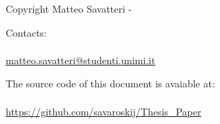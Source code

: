Copyright Matteo Savatteri -
\the\year
\doclicenseThis

\vfill

Contacts:
\\\\
\textcolor{blue}{\href{mailto:matteo.savatteri@studenti.unimi.it}{matteo.savatteri@studenti.unimi.it}}

\vspace{0.8cm}

The source code of this document is avaiable at:
\\\\
\textcolor{blue}{\url{https://github.com/savaroskij/Thesis_Paper}} \hfill
{}

\thispagestyle{empty}
\cleardoublepage
